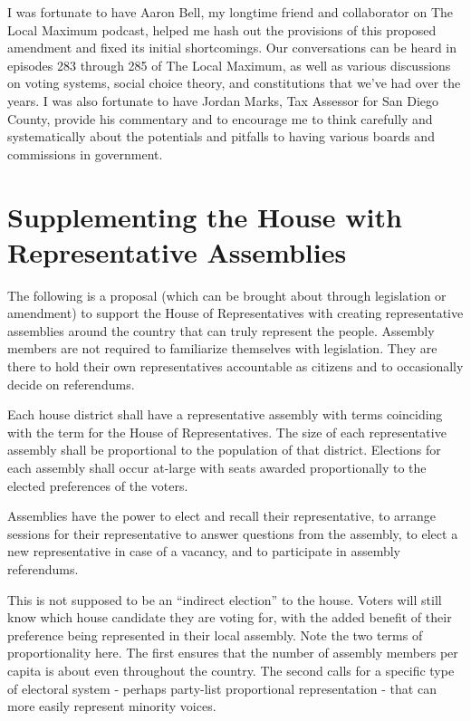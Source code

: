 \documentclass{article}
\begin{document}
I was fortunate to have Aaron Bell, my longtime friend and collaborator on The Local Maximum podcast, helped me hash out the provisions of this proposed amendment and fixed its initial shortcomings. Our conversations can be heard in episodes 283 through 285 of The Local Maximum, as well as various discussions on voting systems, social choice theory, and constitutions that we've had over the years. I was also fortunate to have Jordan Marks, Tax Assessor for San Diego County, provide his commentary and to encourage me to think carefully and systematically about the potentials and pitfalls to having various boards and commissions in government.

\appendix
\section{Supplementing the House with Representative Assemblies}
\label{appendix:house}

The following is a proposal (which can be brought about through legislation or amendment) to support the House of Representatives with creating representative assemblies around the country that can truly represent the people. Assembly members are not required to familiarize themselves with legislation. They are there to hold their own representatives accountable as citizens and to occasionally decide on referendums.

\begin{quoting}
Each house district shall have a representative assembly with terms coinciding with the term for the House of Representatives. The size of each representative assembly shall be proportional to the population of that district. Elections for each assembly shall occur at-large with seats awarded proportionally to the elected preferences of the voters.

Assemblies have the power to elect and recall their representative, to arrange sessions for their representative to answer questions from the assembly, to elect a new representative in case of a vacancy, and to participate in assembly referendums.
\end{quoting}

This is not supposed to be an “indirect election” to the house. Voters will still know which house candidate they are voting for, with the added benefit of their preference being represented in their local assembly. Note the two terms of proportionality here. The first ensures that the number of assembly members per capita is about even throughout the country. The second calls for a specific type of electoral system - perhaps party-list proportional representation - that can more easily represent minority voices.
\end{document}
